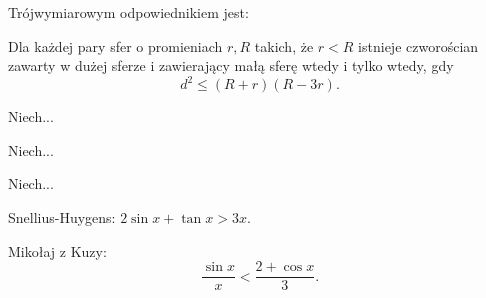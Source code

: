 Trójwymiarowym odpowiednikiem jest:

\begin{proposition}
%
	Dla każdej pary sfer o promieniach $r, R$ takich, że $r < R$ istnieje czworościan zawarty w dużej sferze i zawierający małą sferę wtedy i tylko wtedy, gdy
	\begin{equation}d^2 \le (R+r)(R - 3r).\end{equation}
\end{proposition}

\begin{proposition}
	Niech...
\end{proposition}

\begin{proposition}
	Niech...
\end{proposition}

\begin{proposition}
	Niech...
\end{proposition}

Snellius-Huygens: $2 \sin x + \tan x > 3x$.



Mikołaj z Kuzy:
\begin{equation}
	\frac{\sin x}{x} < \frac{2 + \cos x}{3}.
\end{equation}


